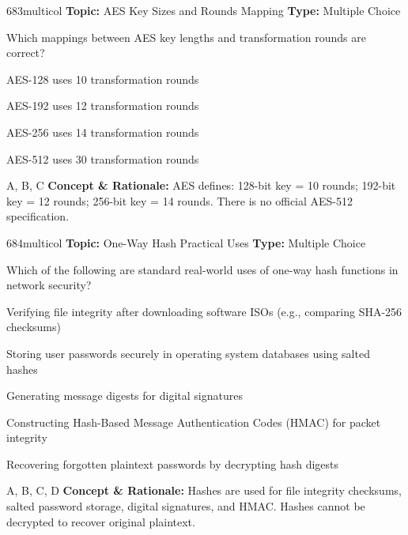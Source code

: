 \begin{qcard}{683}{multicol}
\textcolor{darkslate!75}{\small\textbf{Topic:} AES Key Sizes and Rounds Mapping \hfill \textbf{Type:} Multiple Choice}\vspace{0.4em}\par
Which mappings between AES key lengths and transformation rounds are correct?
\begin{qoptions}
\item AES-128 uses 10 transformation rounds
\item AES-192 uses 12 transformation rounds
\item AES-256 uses 14 transformation rounds
\item AES-512 uses 30 transformation rounds
\end{qoptions}
\end{qcard}
\nopagebreak
\begin{explainbox}{A, B, C}
\textbf{Concept \& Rationale:} AES defines: 128-bit key = 10 rounds; 192-bit key = 12 rounds; 256-bit key = 14 rounds. There is no official AES-512 specification.
\end{explainbox}

\begin{qcard}{684}{multicol}
\textcolor{darkslate!75}{\small\textbf{Topic:} One-Way Hash Practical Uses \hfill \textbf{Type:} Multiple Choice}\vspace{0.4em}\par
Which of the following are standard real-world uses of one-way hash functions in network security?
\begin{qoptions}
\item Verifying file integrity after downloading software ISOs (e.g., comparing SHA-256 checksums)
\item Storing user passwords securely in operating system databases using salted hashes
\item Generating message digests for digital signatures
\item Constructing Hash-Based Message Authentication Codes (HMAC) for packet integrity
\item Recovering forgotten plaintext passwords by decrypting hash digests
\end{qoptions}
\end{qcard}
\nopagebreak
\begin{explainbox}{A, B, C, D}
\textbf{Concept \& Rationale:} Hashes are used for file integrity checksums, salted password storage, digital signatures, and HMAC. Hashes cannot be decrypted to recover original plaintext.
\end{explainbox}

